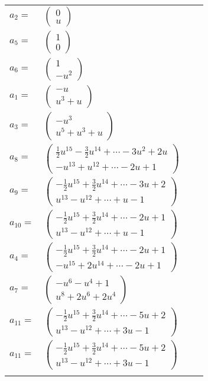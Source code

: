 \documentclass[1p]{elsarticle_modified}
\theoremstyle{definition}
\begin{document}
\begin{tabular}{m{7pt} m{180pt} m{7pt} m{180pt} }
\flushright $a_{2}=$&$\begin{pmatrix}0\\u\end{pmatrix}$ \\
\flushright $a_{5}=$&$\begin{pmatrix}1\\0\end{pmatrix}$ \\
\flushright $a_{6}=$&$\begin{pmatrix}1\\- u^2\end{pmatrix}$ \\
\flushright $a_{1}=$&$\begin{pmatrix}- u\\u^3+u\end{pmatrix}$ \\
\flushright $a_{3}=$&$\begin{pmatrix}- u^3\\u^5+u^3+u\end{pmatrix}$ \\
\flushright $a_{8}=$&$\begin{pmatrix}\frac{1}{2} u^{15}-\frac{3}{2} u^{14}+\cdots-3 u^2+2 u\\- u^{13}+u^{12}+\cdots-2 u+1\end{pmatrix}$ \\
\flushright $a_{9}=$&$\begin{pmatrix}-\frac{1}{2} u^{15}+\frac{3}{2} u^{14}+\cdots-3 u+2\\u^{13}- u^{12}+\cdots+u-1\end{pmatrix}$ \\
\flushright $a_{10}=$&$\begin{pmatrix}-\frac{1}{2} u^{15}+\frac{3}{2} u^{14}+\cdots-2 u+1\\u^{13}- u^{12}+\cdots+u-1\end{pmatrix}$ \\
\flushright $a_{4}=$&$\begin{pmatrix}-\frac{1}{2} u^{15}+\frac{3}{2} u^{14}+\cdots-2 u+1\\- u^{15}+2 u^{14}+\cdots-2 u+1\end{pmatrix}$ \\
\flushright $a_{7}=$&$\begin{pmatrix}- u^6- u^4+1\\u^8+2 u^6+2 u^4\end{pmatrix}$ \\
\flushright $a_{11}=$&$\begin{pmatrix}-\frac{1}{2} u^{15}+\frac{3}{2} u^{14}+\cdots-5 u+2\\u^{13}- u^{12}+\cdots+3 u-1\end{pmatrix}$\\ \flushright $a_{11}=$&$\begin{pmatrix}-\frac{1}{2} u^{15}+\frac{3}{2} u^{14}+\cdots-5 u+2\\u^{13}- u^{12}+\cdots+3 u-1\end{pmatrix}$\\&\end{tabular}
\end{document}
